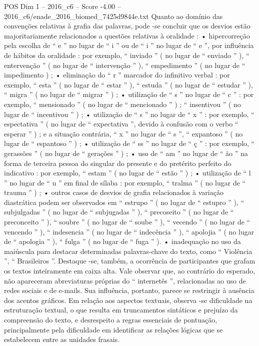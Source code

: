 \begin{textsample}{POS Dim 1 – 2016\_c6 – Score -4.00 – 2016\_c6/enade\_2016\_biomed\_7425d9844e.txt}
Quanto ao domínio das convenções relativas à grafia das palavras, pode -se concluir que os desvios estão majoritariamente relacionados a questões relativas à oralidade : • hipercorreção pela escolha de “ e ” no lugar de “ i ” ou de “ i ” no lugar de “ e ”, por influência de hábitos da oralidade : por exemplo, “ inviado ” ( no lugar de “ enviado ” ), “ entervenção ” ( no lugar de “ intervenção ” ), “ empedimento ” ( no lugar de “ impedimento ) ; • eliminação do “ r ” marcador do infinitivo verbal : por exemplo, “ esta ” ( no lugar de “ estar ” ), “ estuda ” ( no lugar de “ estudar ” ), “ migra ” ( no lugar de “ migrar ” ) ; • utilização de “ s ” no lugar de “ c ” : por exemplo, “ mensionado ” ( no lugar de “ mencionado ” ) ; “ insentivou ” ( no lugar de “ incentivou ” ) ; • utilização de “ s ” no lugar de “ x ” : por exemplo, “ espectativa ” ( no lugar de “ expectativa ”, devido à confusão com o verbo “ esperar ” ) ; e a situação contrária, “ x ” no lugar de “ s ”, “ expantoso ” ( no lugar de “ espantoso ” ) ; • utilização de “ ss ” no lugar de “ ç ” : por exemplo, “ gerassões ” ( no lugar de “ gerações ” ) ; • uso de “ am ” no lugar de “ ão ” na forma de terceira pessoa do singular do presente e do pretérito perfeito do indicativo : por exemplo, “ estam ” ( no lugar de “ estão ” ) ; • utilização de “ l ” no lugar de “ u ” em final de sílaba : por exemplo, “ tralma ” ( no lugar de “ trauma ” ) ; • outros casos de desvios de grafia relacionados à variação diastrática podem ser observados em “ estrupo ” ( no lugar de “ estupro ” ), “ subjulgadas ” ( no lugar de “ subjugadas ” ), “ precoseito ” ( no lugar de “ preconceito ” ), “ soubre ” ( no lugar de “ soube ” ), “ vecendo ” ( no lugar de “ vencendo ” ), “ indesencia ” ( no lugar de “ indecência ” ), “ apolojia ” ( no lugar de “ apologia ” ), “ fulga ” ( no lugar de “ fuga ” ). • inadequação no uso da maiúscula para destacar determinadas palavras-chave do texto, como “ Violência ”, “ Brasileiros ”.
Destaque -se, também, a ocorrência de participantes que grafam os textos inteiramente em caixa alta.
Vale observar que, ao contrário do esperado, não apareceram abreviaturas próprias do “ internetês ”, relacionadas ao uso de redes sociais e de e-mails.
Sua influência, portanto, parece se restringir à ausência dos acentos gráficos.
Em relação aos aspectos textuais, observa -se dificuldade na estruturação textual, o que resulta em truncamentos sintáticos e prejuízo da compreensão do texto, e desrespeito a regras essenciais de pontuação, principalmente pela dificuldade em identificar as relações lógicas que se estabelecem entre as unidades frasais.

\end{textsample}
